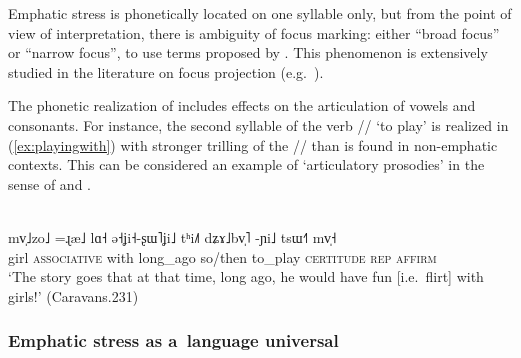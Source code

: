 Emphatic stress is phonetically located on one syllable only, but from the point of view of interpretation, there is ambiguity of focus marking: either “broad focus” or “narrow focus”, to use terms proposed by \citet{lambrecht1994}. This phenomenon is extensively studied in the literature on focus projection (e.g.~\citealt{selkirk1995}). 

The phonetic realization of  includes effects on the articulation of vowels and consonants. For instance, the second syllable of the verb // ‘to play’ is realized in (\ref{ex:playingwith}) with stronger trilling of the // than is found in non-emphatic contexts. 
This can be considered an example of ‘articulatory prosodies’ in the sense of \citet{kohleretal2011} and \citet{niebuhr2013}.

\begin{exe}
	\ex
	\label{ex:playingwith}
	\\
	\gll mv̩˩zo˩		=ɻæ˩		lɑ˧ 	ə˧ʝi˧-ʂɯ˥ʝi˩		tʰi˩˥		dʑɤ˩bv̩˥ 		-ɲi˩ 	tsɯ˧˥	mv̩˧\\
	girl	\textsc{associative}	with	long\_ago	so/then	to\_play		\textsc{certitude}
	\textsc{rep}	\textsc{affirm}\\
	\glt ‘The story goes that at that time, long ago, he would have fun [i.e.\ flirt] with girls!’ (Caravans.231)
\end{exe}


\subsubsection{Emphatic stress as a~language universal}
\label{sec:emphaticstressasalanguageuniversal}


